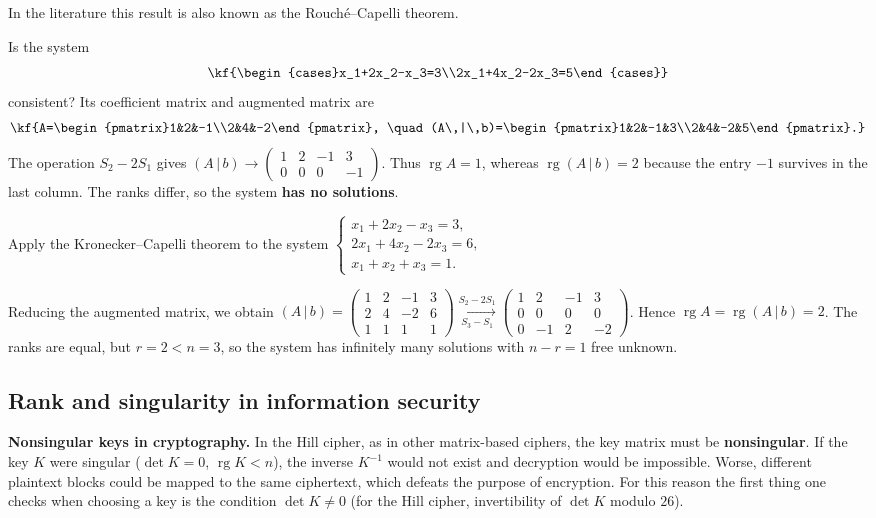 In the literature this result is also known as the Rouché–Capelli theorem.
\begin{misol}
Is the system
\[\kf{\begin{cases}x_1+2x_2-x_3=3\\2x_1+4x_2-2x_3=5\end{cases}}\]
consistent? Its coefficient matrix and augmented matrix are
\[\kf{A=\begin{pmatrix}1&2&-1\\2&4&-2\end{pmatrix}, \quad
(A\,|\,b)=\begin{pmatrix}1&2&-1&3\\2&4&-2&5\end{pmatrix}.}\]
The operation $S_2 - 2S_1$ gives
$(A\,|\,b) \to \begin{pmatrix}1&2&-1&3\\0&0&0&-1\end{pmatrix}$.
Thus $\operatorname{rg}A = 1$, whereas $\operatorname{rg}(A\,|\,b)=2$ because
the entry $-1$ survives in the last column. The ranks differ, so the system
\textbf{has no solutions}.
\end{misol}
\begin{misol}
Apply the Kronecker–Capelli theorem to the system
$\begin{cases}x_1+2x_2-x_3=3,\\2x_1+4x_2-2x_3=6,\\x_1+x_2+x_3=1.\end{cases}$
\begin{yechish}
Reducing the augmented matrix, we obtain
$(A\,|\,b)=\begin{pmatrix}1&2&-1&3\\2&4&-2&6\\1&1&1&1\end{pmatrix}
\xrightarrow[S_3-S_1]{S_2-2S_1}
\begin{pmatrix}1&2&-1&3\\0&0&0&0\\0&-1&2&-2\end{pmatrix}$.
Hence $\operatorname{rg}A=\operatorname{rg}(A\,|\,b)=2$. The ranks are
equal, but $r=2<n=3$, so the system has infinitely many solutions with
$n-r=1$ free unknown.
\end{yechish}
\end{misol}
\bigskip
\subsection{Rank and singularity in information security}
\textbf{Nonsingular keys in cryptography.}
In the Hill cipher, as in other matrix-based ciphers, the key matrix must be
\textbf{nonsingular}. If the key $K$ were singular ($\det K = 0$,
$\operatorname{rg}K < n$), the inverse $K^{-1}$ would not exist and
decryption would be impossible. Worse, different plaintext blocks could be
mapped to the same ciphertext, which defeats the purpose of encryption. For
this reason the first thing one checks when choosing a key is the condition
$\det K \neq 0$ (for the Hill cipher, invertibility of $\det K$ modulo $26$).

